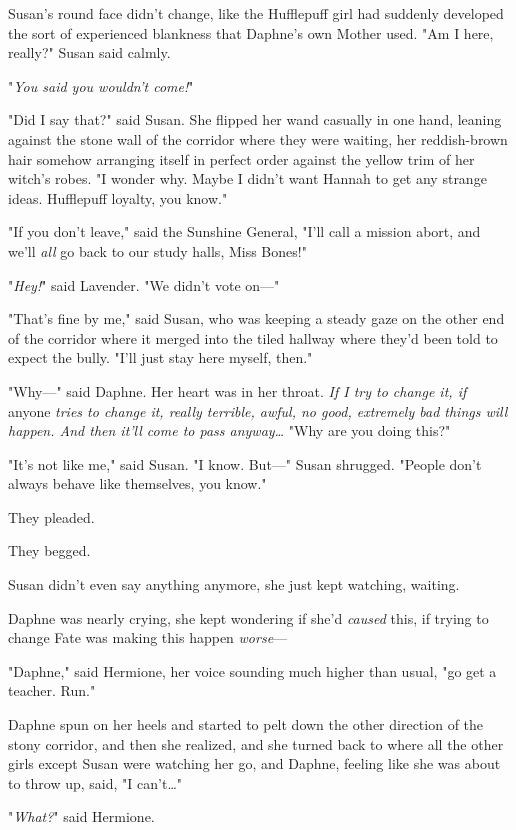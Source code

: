 Susan's round face didn't change, like the Hufflepuff girl had suddenly 
developed the sort of experienced blankness that Daphne's own Mother used. "Am 
I here, really?" Susan said calmly.

"\emph{You said you wouldn't come!}"

"Did I say that?" said Susan. She flipped her wand casually in one hand, 
leaning against the stone wall of the corridor where they were waiting, her 
reddish-brown hair somehow arranging itself in perfect order against the yellow 
trim of her witch's robes. "I wonder why. Maybe I didn't want Hannah to get any 
strange ideas. Hufflepuff loyalty, you know."

"If you don't leave," said the Sunshine General, "I'll call a mission abort, 
and we'll \emph{all} go back to our study halls, Miss Bones!"

"\emph{Hey!}" said Lavender. "We didn't vote on---"

"That's fine by me," said Susan, who was keeping a steady gaze on the other end 
of the corridor where it merged into the tiled hallway where they'd been told 
to expect the bully. "I'll just stay here myself, then."

"Why---" said Daphne. Her heart was in her throat. \emph{If I try to change it, 
if} anyone \emph{tries to change it, really terrible, awful, no good, extremely 
bad things will happen. And then it'll come to pass anyway{\ldots}} "Why are 
you doing this?"

"It's not like me," said Susan. "I know. But---" Susan shrugged. "People don't 
always behave like themselves, you know."

They pleaded.

They begged.

Susan didn't even say anything anymore, she just kept watching, waiting.

Daphne was nearly crying, she kept wondering if she'd \emph{caused} this, if 
trying to change Fate was making this happen \emph{worse}---

"Daphne," said Hermione, her voice sounding much higher than usual, "go get a 
teacher. Run."

Daphne spun on her heels and started to pelt down the other direction of the 
stony corridor, and then she realized, and she turned back to where all the 
other girls except Susan were watching her go, and Daphne, feeling like she was 
about to throw up, said, "I can't{\ldots}"

"\emph{What?}" said Hermione.

